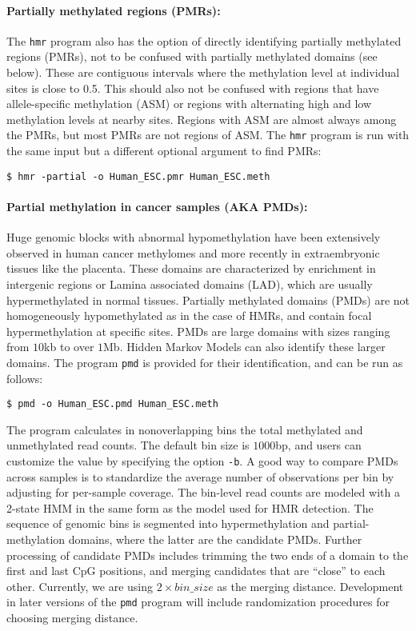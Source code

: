 \documentclass[10pt]{article}
\newcommand{\prog}[1]{\texttt{#1}}
\newcommand{\op}[1]{\texttt{#1}}
\begin{document}
\paragraph{Partially methylated regions (PMRs):}
The \prog{hmr} program also has the option of directly identifying
partially methylated regions (PMRs), not to be confused with partially
methylated domains (see below). These are contiguous intervals where
the methylation level at individual sites is close to 0.5. This should
also not be confused with regions that have allele-specific
methylation (ASM) or regions with alternating high and low methylation
levels at nearby sites. Regions with ASM are almost always among the
PMRs, but most PMRs are not regions of ASM. The \prog{hmr} program is
run with the same input but a different optional argument to find
PMRs:
\begin{verbatim}
$ hmr -partial -o Human_ESC.pmr Human_ESC.meth
\end{verbatim}


\paragraph{Partial methylation in cancer samples (AKA PMDs):}

Huge genomic blocks with abnormal hypomethylation have been
extensively observed in human cancer methylomes and more recently in
extraembryonic tissues like the placenta. These domains are
characterized by enrichment in intergenic regions or Lamina associated
domains (LAD), which are usually hypermethylated in normal
tissues. Partially methylated domains (PMDs) are not homogeneously
hypomethylated as in the case of HMRs, and contain focal
hypermethylation at specific sites. PMDs are large domains with sizes
ranging from $10$kb to over $1$Mb.  Hidden Markov Models can also
identify these larger domains. The program \prog{pmd} is provided for
their identification, and can be run as follows:

\begin{verbatim}
$ pmd -o Human_ESC.pmd Human_ESC.meth
\end{verbatim}

The program calculates in nonoverlapping bins the total methylated and
unmethylated read counts. The default bin size is $1000$bp, and users
can customize the value by specifying the option \op{-b}. A good way to
compare PMDs across samples is to standardize the average number of
observations per bin by adjusting for per-sample coverage. The bin-level 
read counts are modeled with a 2-state HMM in the same form
as the model used for HMR detection. The sequence of genomic bins is
segmented into hypermethylation and partial-methylation domains, where
the latter are the candidate PMDs. Further processing of candidate
PMDs includes trimming the two ends of a domain to the first and last
CpG positions, and merging candidates that are ``close'' to each
other. Currently, we are using $2\times bin\_size$ as the merging
distance. Development in later versions of the \prog{pmd} program will
include randomization procedures for choosing merging distance. 
\end{document}

